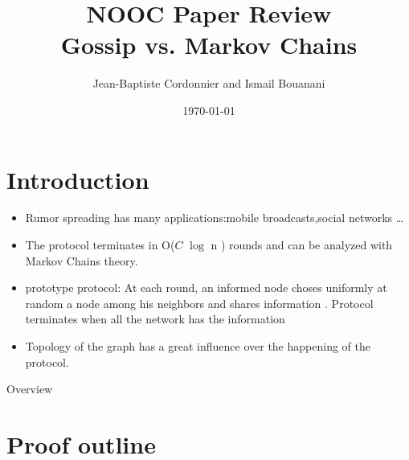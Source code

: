 \documentclass{beamer}
\title{NOOC Paper Review\\Gossip vs. Markov Chains}
\author{Jean-Baptiste Cordonnier and Ismail Bouanani}
\date{\today}
\begin{document}



\frame{\titlepage}
\section{Introduction}
\begin{frame}
\begin{itemize}
\frametitle{Introduction}
\item Rumor spreading has many applications:mobile broadcasts,social networks \dots
\item The protocol  terminates in O($C$ $\log$ n ) rounds and can be analyzed with Markov Chains theory.
\item prototype protocol: At each round, an informed node choses uniformly at random  a node among his neighbors and shares information . Protocol terminates when all the network has the information
\item Topology of the graph has a great influence over the happening of the protocol.




\end{itemize}
\end {frame}

\begin{frame}{Overview}
\tableofcontents
\end{frame}


\section {Proof outline}

\frame{\sectionpage}
\end{document}
